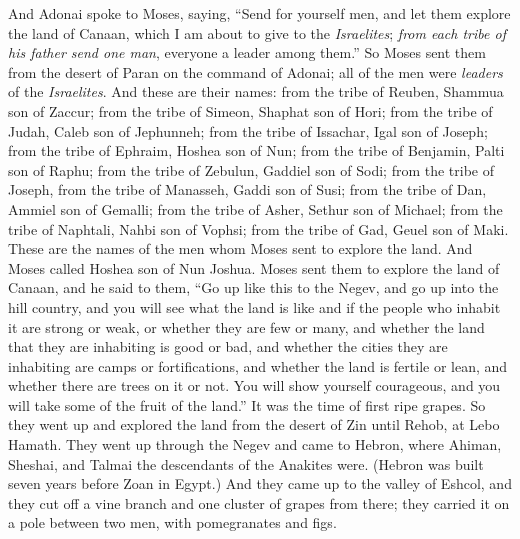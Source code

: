 \begin{biblechapter} %
 And Adonai spoke to Moses, saying,
\verse “Send for yourself men, and let them explore the land of Canaan, which I am about to give to the \textit{Israelites}; \textit{from each tribe of his father send one man}, everyone a leader among them.”
\verse So Moses sent them from the desert of Paran on the command of Adonai; all of the men were \textit{leaders} of the \textit{Israelites}.
\verse And these are their names: from the tribe of Reuben, Shammua son of Zaccur;
\verse from the tribe of Simeon, Shaphat son of Hori;
\verse from the tribe of Judah, Caleb son of Jephunneh;
\verse from the tribe of Issachar, Igal son of Joseph;
\verse from the tribe of Ephraim, Hoshea son of Nun;
\verse from the tribe of Benjamin, Palti son of Raphu;
\verse from the tribe of Zebulun, Gaddiel son of Sodi;
\verse from the tribe of Joseph, from the tribe of Manasseh, Gaddi son of Susi;
\verse from the tribe of Dan, Ammiel son of Gemalli;
\verse from the tribe of Asher, Sethur son of Michael;
\verse from the tribe of Naphtali, Nahbi son of Vophsi;
\verse from the tribe of Gad, Geuel son of Maki.
\verse These are the names of the men whom Moses sent to explore the land. And Moses called Hoshea son of Nun Joshua.
\verse Moses sent them to explore the land of Canaan, and he said to them, “Go up like this to the Negev, and go up into the hill country,
\verse and you will see what the land is like and if the people who inhabit it are strong or weak, or whether they are few or many,
\verse and whether the land that they are inhabiting is good or bad, and whether the cities they are inhabiting are camps or fortifications,
\verse and whether the land is fertile or lean, and whether there are trees on it or not. You will show yourself courageous, and you will take some of the fruit of the land.” It was the time of first ripe grapes.
\verse So they went up and explored the land from the desert of Zin until Rehob, at Lebo Hamath.
\verse They went up through the Negev and came to Hebron, where Ahiman, Sheshai, and Talmai the descendants of the Anakites were. (Hebron was built seven years before Zoan in Egypt.)
\verse And they came up to the valley of Eshcol, and they cut off a vine branch and one cluster of grapes from there; they carried it on a pole between two men, with pomegranates and figs.

\end{biblechapter}
